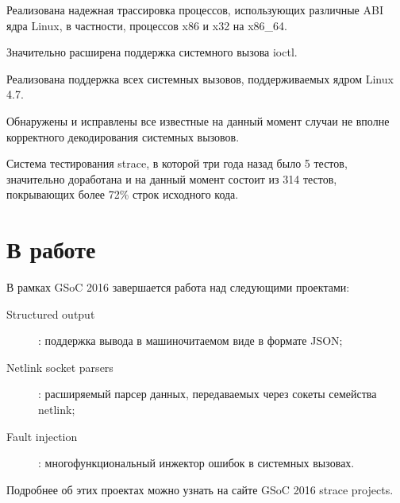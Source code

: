 \documentclass[10pt, a5paper]{article}
\begin{document}
Реализована надежная трассировка процессов, использующих различные ABI ядра
Linux, в частности, процессов x86 и x32 на x86\_64.

Значительно расширена поддержка системного вызова ioctl.

Реализована поддержка всех системных вызовов, поддерживаемых ядром Linux 4.7.

Обнаружены и исправлены все известные на данный момент случаи не вполне
корректного декодирования системных вызовов.

Система тестирования strace, в которой три года назад было 5 тестов,
значительно доработана и на данный момент состоит из 314 тестов, покрывающих
более 72\% строк исходного кода.

\section*{В работе}
В рамках GSoC 2016 завершается работа над следующими проектами:
\begin{description}
\item[Structured output]: поддержка вывода в машиночитаемом виде в формате
JSON;
\item [Netlink socket parsers]: расширяемый парсер данных, передаваемых через
сокеты семейства netlink;
\item [Fault injection]: многофункциональный инжектор ошибок в системных
вызовах.
\end{description}

Подробнее об этих проектах можно узнать на сайте GSoC 2016 strace
projects\cite{gsoc2016}.
\end{document}
